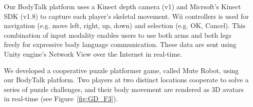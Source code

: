 
Our BodyTalk platform uses a Kinect depth camera (v1) and Micrsoft's Kinect SDK (v1.8) to capture each player's skeletal movement. 
Wii controllers is used for navigation (e.g. move left, right, up, down) and selection (e.g. OK, Cancel). 
This combination of input modality enables users to use both arms and both legs freely for expressive body language communication.
These data are sent using Unity engine's\cite{unity} Network View over the Internet in real-time.

We developed a cooperative puzzle platformer game, called Mute Robot, using our BodyTalk platform. Two players at two distinct locations cooperate to solve a series of puzzle challenges, and their body movement are rendered as 3D avatars in real-time (see Figure~\ref{fig:GD_F3}). 



